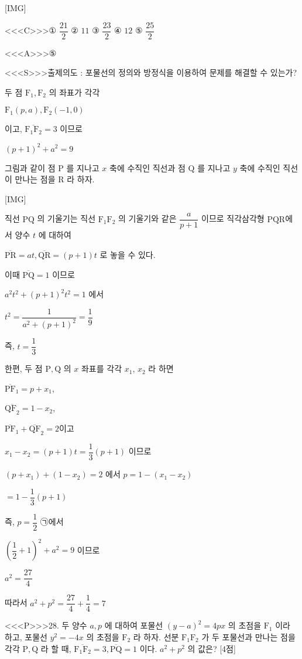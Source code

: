\documentclass{oblivoir}
\begin{document}
[IMG]


<<<C>>>① $\dfrac{21}{2}$
② $11$
③ $\dfrac{23}{2}$
④ $12$
⑤ $\dfrac{25}{2}$


<<<A>>>⑤

<<<S>>>출제의도 : 포물선의 정의와 방정식을 이용하여 문제를 해결할 수 있는가?

두 점 $\mathrm{F}_{1}, \mathrm{F}_{2}$ 의 좌표가 각각

$\mathrm{F}_{1}(p, a), \mathrm{F}_{2}(-1,0)$

이고, $\overline{\mathrm{F}_{1} \mathrm{F}_{2}}=3$ 이므로

$(p+1)^{2}+a^{2}=9$

그림과 같이 점 $\mathrm{P}$ 를 지나고 $x$ 축에 수직인 직선과 점 $\mathrm{Q}$ 를 지나고 $y$ 축에 수직인
직선이 만나는 점을 $\mathrm{R}$ 라 하자.

[IMG]

직선 $\mathrm{PQ}$ 의 기울기는 직선 $\mathrm{F}_{1} \mathrm{F}_{2}$ 의 기울기와 같은 $\dfrac{a}{p+1}$ 이므로 직각삼각형 $\mathrm{PQR}$에서 양수 $t$ 에 대하여

$\overline{\mathrm{PR}}=a t, \overline{\mathrm{QR}}=(p+1) t$
로 놓을 수 있다.

이때 $\overline{\mathrm{PQ}}=1$ 이므로

$a^{2} t^{2}+(p+1)^{2} t^{2}=1$
에서

$t^{2}=\dfrac{1}{a^{2}+(p+1)^{2}}=\dfrac{1}{9}$

즉, $t=\dfrac{1}{3}$

한편, 두 점 $\mathrm{P}, \mathrm{Q}$ 의 $x$ 좌표를 각각 $x_{1}$, $x_{2}$ 라 하면

$\overline{\mathrm{PF}}_{1}=p+x_{1}$,

$\overline{\mathrm{QF}_{2}}=1-x_{2}$,

$\overline{\mathrm{PF}}_{1}+\overline{\mathrm{QF}}_{2}=2$이고

$x_{1}-x_{2}=(p+1) t=\dfrac{1}{3}(p+1)$
이므로

$\left(p+x_{1}\right)+\left(1-x_{2}\right)=2$
에서
$p=1-\left(x_{1}-x_{2}\right)$

$=1-\dfrac{1}{3}(p+1)$

즉, $p=\dfrac{1}{2}$
㉠에서

$\left(\dfrac{1}{2}+1\right)^{2}+a^{2}=9$
이므로

$a^{2}=\dfrac{27}{4}$

따라서
$a^{2}+p^{2}=\dfrac{27}{4}+\dfrac{1}{4}=7$


<<<P>>>28. 두 양수 $a, p$ 에 대하여 포물선 $(y-a)^{2}=4 p x$ 의 초점을 $\mathrm{F}_{1}$ 이라 하고, 포물선 $y^{2}=-4 x$ 의 초점을 $\mathrm{F}_{2}$ 라 하자. 선분 $\mathrm{F}_{1} \mathrm{F}_{2}$ 가 두 포물선과 만나는 점을 각각 $\mathrm{P}, \mathrm{Q}$ 라 할 때, $\overline{\mathrm{F}_{1} \mathrm{F}_{2}}=3, \overline{\mathrm{PQ}}=1$ 이다. $a^{2}+p^{2}$ 의 값은? [4점]
\end{document}
